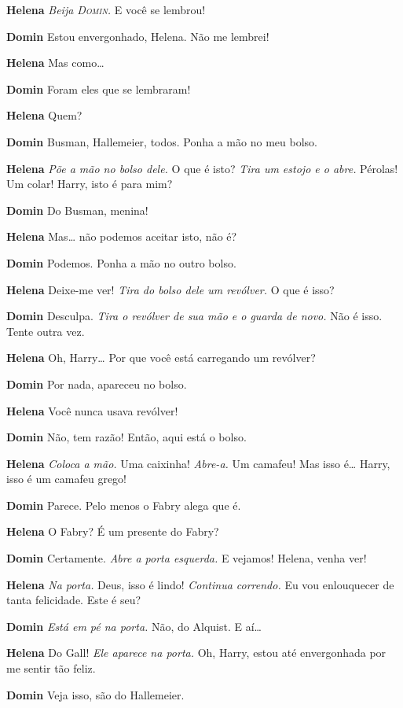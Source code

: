 \textbf{Helena} \emph{Beija \textsc{Domin}.} E você se lembrou!

\textbf{Domin} Estou envergonhado, Helena. Não me lembrei!

\textbf{Helena} Mas como\ldots{}

\textbf{Domin} Foram eles que se lembraram!

\textbf{Helena} Quem?

\textbf{Domin} Busman, Hallemeier, todos. Ponha a mão no meu bolso.

\textbf{Helena} \emph{Põe a mão no bolso dele.} O que é isto? \emph{Tira um estojo e
o abre.} Pérolas! Um colar! Harry, isto é para mim?

\textbf{Domin} Do Busman, menina!

\textbf{Helena} Mas\ldots{} não podemos aceitar isto, não é?

\textbf{Domin} Podemos. Ponha a mão no outro bolso.

\textbf{Helena} Deixe-me ver! \emph{Tira do bolso dele um revólver.} O que é isso?

\textbf{Domin} Desculpa. \emph{Tira o revólver de sua mão e o guarda de novo.} Não é
isso. Tente outra vez.

\textbf{Helena} Oh, Harry\ldots{} Por que você está carregando um revólver?

\textbf{Domin} Por nada, apareceu no bolso.

\textbf{Helena} Você nunca usava revólver!

\textbf{Domin} Não, tem razão! Então, aqui está o bolso.

\textbf{Helena} \emph{Coloca a mão.} Uma caixinha! \emph{Abre-a.} Um camafeu! Mas
isso é\ldots{} Harry, isso é um camafeu grego!

\textbf{Domin} Parece. Pelo menos o Fabry alega que é.

\textbf{Helena} O Fabry? É um presente do Fabry?

\textbf{Domin} Certamente. \emph{Abre a porta esquerda.} E vejamos! Helena, venha ver!

\textbf{Helena} \emph{Na porta.} Deus, isso é lindo! \emph{Continua correndo.} Eu
vou enlouquecer de tanta felicidade. Este é seu?

\textbf{Domin} \emph{Está em pé na porta.} Não, do Alquist. E aí\ldots{}

\textbf{Helena} Do Gall! \emph{Ele aparece na porta.} Oh, Harry, estou até
envergonhada por me sentir tão feliz.

\textbf{Domin} Veja isso, são do Hallemeier.

